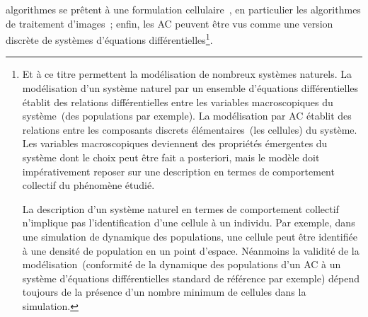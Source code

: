 algorithmes se prêtent à une formulation
cellulaire~\cite[]{Uhr87,Uhr84}, en particulier les algorithmes de
traitement d'images~\cite[]{Preston84,Hasselbring92}; enfin, les AC
peuvent être vus comme une version discrète de systèmes
d'équations différentielles\footnote{%
  Et à ce titre permettent la modélisation de nombreux systèmes
  naturels. %
  La modélisation d'un système naturel par un ensemble d'équations
  différentielles établit des relations différentielles entre les
  variables macroscopiques du système~(des populations par exemple). %
  La modélisation par AC établit des relations entre les composants
  discrets élémentaires~(les cellules) du système. %
  Les variables macroscopiques deviennent des propriétés émergentes du
  système dont le choix peut être fait a posteriori, mais le modèle
  doit impérativement reposer sur une description en termes de
  comportement collectif du phénomène étudié. %

  La description d'un système naturel en termes de comportement
  collectif n'implique pas l'identification d'une cellule à un
  individu. %
  Par exemple, dans une simulation de dynamique des populations, une
  cellule peut être identifiée à une densité de population en un point
  d'espace. %
  Néanmoins la validité de la modélisation~(conformité de la dynamique
  des populations d'un AC à un système d'équations différentielles
  standard de référence par exemple) dépend toujours de la présence
  d'un nombre minimum de cellules dans la simulation.}. %





